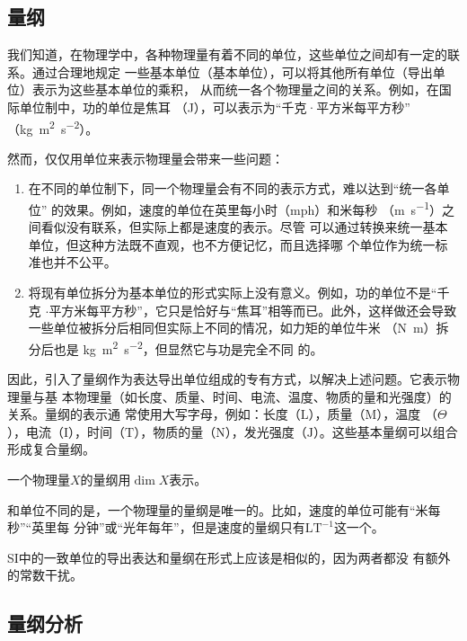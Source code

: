 \subsection{量纲}

我们知道，在物理学中，各种物理量有着不同的单位，这些单位之间却有一定的联系。通过合理地规定
一些基本单位（基本单位），可以将其他所有单位（导出单位）表示为这些基本单位的乘积，
从而统一各个物理量之间的关系。例如，在国际单位制中，功的单位是焦耳
（\si{\joule}），可以表示为“千克·平方米每平方秒”
（\si{\kilogram\meter\squared\per\second\squared}）。

然而，仅仅用单位来表示物理量会带来一些问题：

\begin{enumerate}
    \item 在不同的单位制下，同一个物理量会有不同的表示方式，难以达到“统一各单位”
        的效果。例如，速度的单位在英里每小时（mph）和米每秒
        （\si{\meter\per\second}）之间看似没有联系，但实际上都是速度的表示。尽管
        可以通过转换来统一基本单位，但这种方法既不直观，也不方便记忆，而且选择哪
        个单位作为统一标准也并不公平。
    
    \item 将现有单位拆分为基本单位的形式实际上没有意义。例如，功的单位不是“千克
        $\cdot$平方米每平方秒”，它只是恰好与“焦耳”相等而已。此外，这样做还会导致
        一些单位被拆分后相同但实际上不同的情况，如力矩的单位牛米
        （\si{\newton\meter}）拆分后也是
        \si{\kilogram\meter\squared\per\second\squared}，但显然它与功是完全不同
        的。
\end{enumerate}



因此，引入了量纲作为表达导出单位组成的专有方式，以解决上述问题。它表示物理量与基
本物理量（如长度、质量、时间、电流、温度、物质的量和光强度）的关系。量纲的表示通
常使用大写字母，例如：长度（$\mathrm {L} $），质量（$\mathrm {M} $），温度
（$\Theta$），电流（$\mathrm {I} $），时间（$\mathrm{T}$），物质的量（$\mathrm 
{N} $），发光强度（$\mathrm {J} $）。这些基本量纲可以组合形成复合量纲。

一个物理量$X$的量纲用$\dim X$表示。

和单位不同的是，一个物理量的量纲是唯一的。比如，速度的单位可能有“米每秒”“英里每
分钟”或“光年每年”，但是速度的量纲只有$\mathrm{LT^{-1}}$这一个。

SI中的一致单位的导出表达和量纲在形式上应该是相似的，因为两者都没
有额外的常数干扰。

\subsection{量纲分析}

